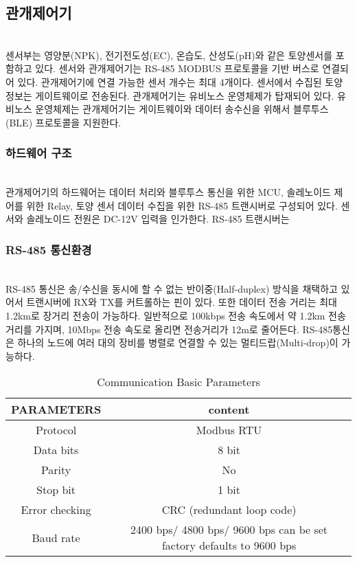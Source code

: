 \documentclass[11pt]{article}
\begin{document}
\subsection{관개제어기}
\indent \\센서부는 영양분(NPK), 전기전도성(EC), 온습도, 산성도(pH)와 같은 토양센서를 포함하고 있다. 센서와 관개제어기는 RS-485 MODBUS 프로토콜을 기반 버스로 연결되어 있다. 관개제어기에 연결 가능한 센서 개수는 최대 4개이다. 센서에서 수집된 토양 정보는 게이트웨이로 전송된다.
관개제어기는 유비노스 운영체제가 탑재되어 있다. 유비노스 운영체제는  
관개제어기는 게이트웨이와 데이터 송수신을 위해서 블루투스(BLE) 프로토콜을 지원한다.

\subsubsection{하드웨어 구조}
\indent \\관개제어기의 하드웨어는 데이터 처리와 블루투스 통신을 위한 MCU, 솔레노이드 제어를 위한 Relay, 토양 센서 데이터 수집을 위한 RS-485 트랜시버로 구성되어 있다. 센서와 솔레노이드 전원은 DC-12V 입력을 인가한다. RS-485 트랜시버는 

\subsubsection{RS-485 통신환경}
\indent \\RS-485 통신은 송/수신을 동시에 할 수 없는 반이중(Half-duplex) 방식을 채택하고 있어서 트랜시버에 RX와 TX를 커트롤하는 핀이 있다. 또한 데이터 전송 거리는 최대 1.2km로 장거리 전송이 가능하다. 일반적으로 100kbps 전송 속도에서 약 1.2km 전송거리를 가지며, 10Mbps 전송 속도로 올리면 전송거리가 12m로 줄어든다. RS-485통신은 하나의 노드에 여러 대의 장비를 병렬로 연결할 수 있는 멀티드랍(Multi-drop)이 가능하다.

\begin{table}
    \centering
    \caption{Communication Basic Parameters}
    \label{t1}
    \resizebox{\textwidth}{!}
    {%
    \begin{tabular}{|c|c|}
    \noalign{\smallskip}\noalign{\smallskip}\hline
    PARAMETERS & content \\
    \hline
    Protocol & Modbus RTU \\
    \hline
    Data bits & 8 bit \\
    \hline
    Parity  & No \\
    \hline
    Stop bit  & 1 bit \\
    \hline
    Error checking  & CRC (redundant loop code) \\
    \hline
    Baud rate  & 2400 bps/ 4800 bps/ 9600 bps can be set factory defaults to 9600 bps\\
    \hline
    \end{tabular}
    }
\end{table}
\end{document}
